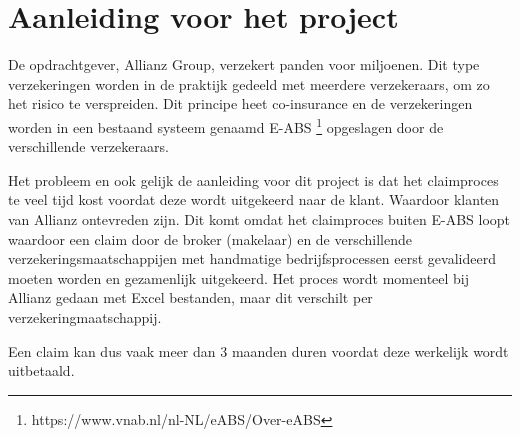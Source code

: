 \chapter{Aanleiding voor het project}
De opdrachtgever, Allianz Group, verzekert panden voor miljoenen. Dit type verzekeringen worden in de praktijk gedeeld met meerdere verzekeraars, om zo het risico te verspreiden. Dit principe heet co-insurance en de verzekeringen worden in een bestaand systeem genaamd E-ABS \footnote{https://www.vnab.nl/nl-NL/eABS/Over-eABS} opgeslagen door de verschillende verzekeraars.\par

Het probleem en ook gelijk de aanleiding voor dit project is dat het claimproces te veel tijd kost voordat deze wordt uitgekeerd naar de klant. Waardoor klanten van Allianz ontevreden zijn. Dit komt omdat het claimproces buiten E-ABS loopt waardoor een claim door de broker (makelaar) en de verschillende verzekeringsmaatschappijen met handmatige bedrijfsprocessen eerst gevalideerd moeten worden en gezamenlijk uitgekeerd. Het proces wordt momenteel bij Allianz gedaan met Excel bestanden, maar dit verschilt per verzekeringmaatschappij.\par

 Een claim kan dus vaak meer dan 3 maanden duren voordat deze werkelijk wordt uitbetaald.